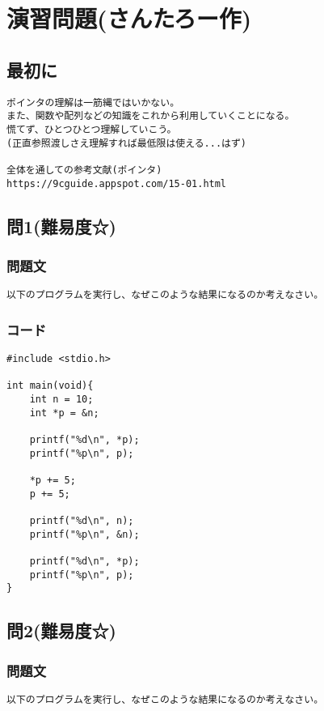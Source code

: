 \section{演習問題(さんたろー作)}
\subsection{最初に}
\begin{verbatim}
ポインタの理解は一筋縄ではいかない。
また、関数や配列などの知識をこれから利用していくことになる。
慌てず、ひとつひとつ理解していこう。
(正直参照渡しさえ理解すれば最低限は使える...はず)

全体を通しての参考文献(ポインタ)
https://9cguide.appspot.com/15-01.html
\end{verbatim}
\subsection{問1(難易度☆)}
\subsubsection{問題文}
\begin{verbatim}
以下のプログラムを実行し、なぜこのような結果になるのか考えなさい。
\end{verbatim}

\subsubsection{コード}
\begin{verbatim}
#include <stdio.h>

int main(void){
    int n = 10;
    int *p = &n;

    printf("%d\n", *p);
    printf("%p\n", p);

    *p += 5;
    p += 5;

    printf("%d\n", n);
    printf("%p\n", &n);

    printf("%d\n", *p);
    printf("%p\n", p);
}
\end{verbatim}

\subsection{問2(難易度☆)}
\subsubsection{問題文}
\begin{verbatim}
以下のプログラムを実行し、なぜこのような結果になるのか考えなさい。
\end{verbatim}


